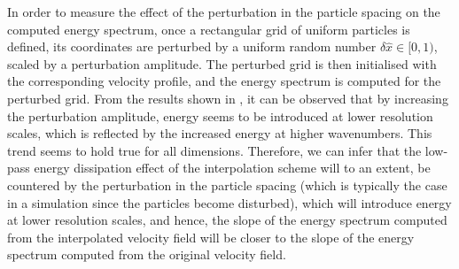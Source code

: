 In order to measure the effect of the perturbation in the particle spacing on the computed energy spectrum, once a rectangular grid of uniform particles is defined, its coordinates are perturbed by a uniform random number $\delta \hat{x} \in [0, 1)$, scaled by a perturbation amplitude. The perturbed grid is then initialised with the corresponding velocity profile, and the energy spectrum is computed for the perturbed grid. From the results shown in , it can be observed that by increasing the perturbation amplitude, energy seems to be introduced at lower resolution scales, which is reflected by the increased energy at higher wavenumbers. This trend seems to hold true for all dimensions.
Therefore, we can infer that the low-pass energy dissipation effect of the interpolation scheme will to an extent, be countered by the perturbation in the particle spacing (which is typically the case in a simulation since the particles become disturbed), which will introduce energy at lower resolution scales, and hence, the slope of the energy spectrum computed from the interpolated velocity field will be closer to the slope of the energy spectrum computed from the original velocity field. 

